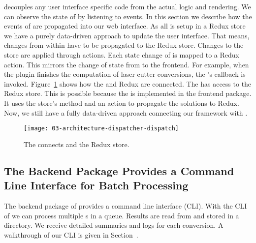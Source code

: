 \documentclass[../../ClassicThesis.tex]{subfiles}
\begin{document}
{\convertify} decouples any user interface specific code
from the actual logic and rendering. We can observe the
state of {\convertify} by listening to events. In this
section we describe how the events of {\convertify} are
propagated into our web interface. As all {\userinterface}
is setup in a Redux store we have a purely data-driven
approach to update the user interface. That means, changes
from within {\convertify} have to be propagated to the Redux
store. Changes to the store are applied through actions.
Each state change of {\convertify} is mapped to a Redux
action. This mirrors the change of state from {\convertify}
to the frontend. For example, when the
 plugin finishes the computation of
laser cutter conversions, the 's
 callback is invoked.
Figure~\ref{fig:dispatcher-dispatch} shows how the
 and Redux are connected. The
 has access to the Redux store. This is
possible because the  is implemented in
the frontend package. It uses the store's
 method and an action to propagate the
solutions to Redux. Now, we still have a fully data-driven
approach connecting our framework with {\platener}.

\begin{figure}[!p]
  \centering
  \texttt{[image: 03-architecture-dispatcher-dispatch]}
  \caption{The  connects {\convertify} and the Redux store.}
  \label{fig:dispatcher-dispatch}
\end{figure}

\subsection{The Backend Package Provides a Command Line Interface for
  Batch Processing}
\label{sec:cli-tool}





The backend package of {\platener} provides a command line interface
(CLI). With the CLI of {\platener} we can process multiple
{\threedmodel}s in a queue. Results are read from and stored in
a directory. We receive detailed summaries and logs for each
conversion. A walkthrough of our CLI is given in
Section~.
\end{document}
